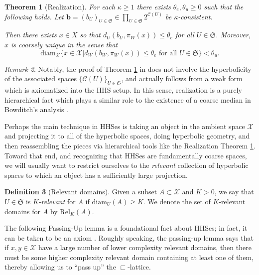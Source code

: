 \documentclass{amsart}
\newtheorem{theorem}{Theorem}[section]
\theoremstyle{definition}
\newtheorem{definition}[theorem]{Definition}
\theoremstyle{remark}
\newtheorem{remark}[theorem]{Remark}
\theoremstyle{definition}
\newcommand{\calC}{\mathcal{C}}
\newcommand{\calX}{\mathcal{X}}
\newcommand{\Rel}{\mathrm{Rel}}
\newcommand{\diam}{\mathrm{diam}}
\newcommand{\nest}{\sqsubset}
\begin{document}
\begin{theorem}[Realization]\label{thm:realization}
For each $\kappa \geq 1$ there exists $\theta_e, \theta_u \geq 0$ such that the following holds.  Let $\mathbf{b} = (b_U)_{U \in \mathfrak S} \in \prod_{U \in \mathfrak S} 2^{\calC(U)}$ be $\kappa$-consistent.

Then there exists $x \in X$ so that $d_U(b_U, \pi_W(x)) \leq \theta_e$ for all $U \in \mathfrak S$.  Moreover, $x$ is \emph{coarsely unique} in the sense that 
$$\diam_{\calX} \{x \in \calX| d_W(b_W, \pi_W(x)) \leq \theta_e \textrm{ for all } U \in \mathfrak S\} < \theta_u.$$
\end{theorem}

\begin{remark}
Notably, the proof of Theorem \ref{thm:realization} in \cite{HHS_II} does not involve the hyperbolicity of the associated spaces $\{\calC(U)\}_{U \in \mathfrak S}$, and actually follows from a weak form which is axiomatized into the HHS setup.  In this sense, realization is a purely hierarchical fact which plays a similar role to the existence of a coarse median in Bowditch's analysis \cite{Bowditch_hulls}.


\end{remark}

Perhaps the main technique in HHSes is taking an object in the ambient space $\calX$ and projecting it to all of the hyperbolic spaces, doing hyperbolic geometry, and then reassembling the pieces via hierarchical tools like the Realization Theorem \ref{thm:realization}.  Toward that end, and recognizing that HHSes are fundamentally coarse spaces, we will usually want to restrict ourselves to the \emph{relevant} collection of hyperbolic spaces to which an object has a sufficiently large projection.

\begin{definition}[Relevant domains] \label{defn:relevant}
Given a subset $A \subset \calX$ and $K > 0$, we say that $U \in \mathfrak S$ is $K$-\emph{relevant} for $A$ if $\diam_U(A) \geq K$.  We denote the set of $K$-relevant domains for $A$ by $\Rel_K(A)$.
\end{definition}


The following Passing-Up lemma is a foundational fact about HHSes; in fact, it can be taken to be an axiom \cite[Proposition 4.15]{Dur_infcube}.  Roughly speaking, the passing-up lemma says that if $x,y \in \calX$ have a large number of lower complexity relevant domains, then there must be some higher complexity relevant domain containing at least one of them, thereby allowing us to ``pass up'' the $\nest$-lattice.
\end{document}
